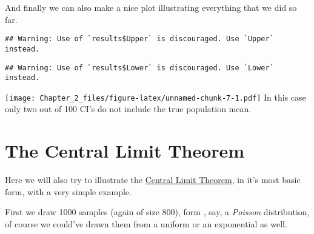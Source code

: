 \documentclass[
]{book}
\newenvironment{Shaded}{\begin{snugshade}}{\end{snugshade}}
\newcommand{\AttributeTok}[1]{\textcolor[rgb]{0.77,0.63,0.00}{#1}}
\newcommand{\CommentTok}[1]{\textcolor[rgb]{0.56,0.35,0.01}{\textit{#1}}}
\newcommand{\DecValTok}[1]{\textcolor[rgb]{0.00,0.00,0.81}{#1}}
\newcommand{\FunctionTok}[1]{\textcolor[rgb]{0.00,0.00,0.00}{#1}}
\newcommand{\NormalTok}[1]{#1}
\newcommand{\OtherTok}[1]{\textcolor[rgb]{0.56,0.35,0.01}{#1}}
\newcommand{\SpecialCharTok}[1]{\textcolor[rgb]{0.00,0.00,0.00}{#1}}
\newcommand{\StringTok}[1]{\textcolor[rgb]{0.31,0.60,0.02}{#1}}
\begin{document}
And finally we can also make a nice plot illustrating everything that we did so far.

\begin{Shaded}
\end{Shaded}

\begin{verbatim}
## Warning: Use of `results$Upper` is discouraged. Use `Upper` instead.
\end{verbatim}

\begin{verbatim}
## Warning: Use of `results$Lower` is discouraged. Use `Lower` instead.
\end{verbatim}

\texttt{[image: Chapter\_2\_files/figure-latex/unnamed-chunk-7-1.pdf]}
In this case only two out of 100 CI's do not include the true population mean.

\hypertarget{the-central-limit-theorem}{%
\section{The Central Limit Theorem}\label{the-central-limit-theorem}}

Here we will also try to illustrate the \href{https://en.wikipedia.org/wiki/Central_limit_theorem}{Central Limit Theorem}, in it's most basic form, with a very simple example.

First we draw 1000 samples (again of size 800), form , say, a \emph{Poisson} distribution, of course we could've drawn them from a uniform or an exponential as well.
\end{document}

